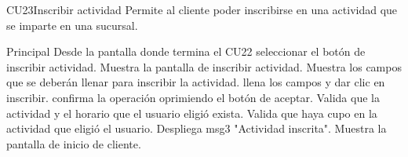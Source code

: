 	\begin{UseCase}{CU23}{Inscribir actividad}{
		Permite  al cliente poder inscribirse en una actividad que se imparte en una sucursal.
	}
	\end{UseCase}
	\begin{UCtrayectoria}{Principal}
		\UCpaso[\UCactor] Desde la pantalla donde termina el CU22 seleccionar el botón de inscribir actividad.
		\UCpaso Muestra la pantalla de inscribir actividad.
		\UCpaso Muestra los campos que se deberán llenar para inscribir la actividad.
		\UCpaso[\UCactor] llena los campos y dar clic en inscribir.
		\UCpaso[\UCactor] confirma la operación oprimiendo el botón de aceptar. 
		\UCpaso Valida que la actividad y el horario que el usuario eligió exista.
		\UCpaso Valida que haya cupo en la actividad que eligió el usuario.
		\UCpaso Despliega msg3 "Actividad inscrita".
		\UCpaso Muestra la pantalla de inicio de cliente.	
	\end{UCtrayectoria}



